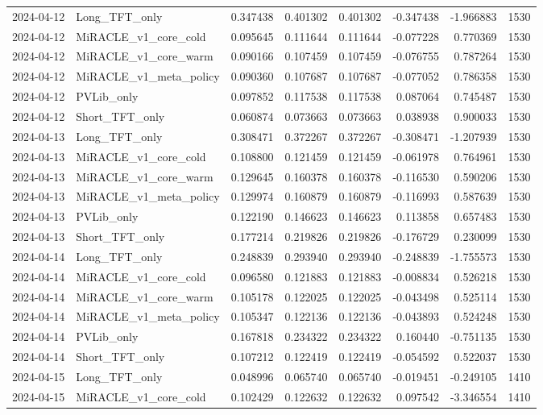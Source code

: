 \begin{tabular}{llrrrrrr}
2024-04-12 & Long_TFT_only & 0.347438 & 0.401302 & 0.401302 & -0.347438 & -1.966883 & 1530 \\
2024-04-12 & MiRACLE_v1_core_cold & 0.095645 & 0.111644 & 0.111644 & -0.077228 & 0.770369 & 1530 \\
2024-04-12 & MiRACLE_v1_core_warm & 0.090166 & 0.107459 & 0.107459 & -0.076755 & 0.787264 & 1530 \\
2024-04-12 & MiRACLE_v1_meta_policy & 0.090360 & 0.107687 & 0.107687 & -0.077052 & 0.786358 & 1530 \\
2024-04-12 & PVLib_only & 0.097852 & 0.117538 & 0.117538 & 0.087064 & 0.745487 & 1530 \\
2024-04-12 & Short_TFT_only & 0.060874 & 0.073663 & 0.073663 & 0.038938 & 0.900033 & 1530 \\
2024-04-13 & Long_TFT_only & 0.308471 & 0.372267 & 0.372267 & -0.308471 & -1.207939 & 1530 \\
2024-04-13 & MiRACLE_v1_core_cold & 0.108800 & 0.121459 & 0.121459 & -0.061978 & 0.764961 & 1530 \\
2024-04-13 & MiRACLE_v1_core_warm & 0.129645 & 0.160378 & 0.160378 & -0.116530 & 0.590206 & 1530 \\
2024-04-13 & MiRACLE_v1_meta_policy & 0.129974 & 0.160879 & 0.160879 & -0.116993 & 0.587639 & 1530 \\
2024-04-13 & PVLib_only & 0.122190 & 0.146623 & 0.146623 & 0.113858 & 0.657483 & 1530 \\
2024-04-13 & Short_TFT_only & 0.177214 & 0.219826 & 0.219826 & -0.176729 & 0.230099 & 1530 \\
2024-04-14 & Long_TFT_only & 0.248839 & 0.293940 & 0.293940 & -0.248839 & -1.755573 & 1530 \\
2024-04-14 & MiRACLE_v1_core_cold & 0.096580 & 0.121883 & 0.121883 & -0.008834 & 0.526218 & 1530 \\
2024-04-14 & MiRACLE_v1_core_warm & 0.105178 & 0.122025 & 0.122025 & -0.043498 & 0.525114 & 1530 \\
2024-04-14 & MiRACLE_v1_meta_policy & 0.105347 & 0.122136 & 0.122136 & -0.043893 & 0.524248 & 1530 \\
2024-04-14 & PVLib_only & 0.167818 & 0.234322 & 0.234322 & 0.160440 & -0.751135 & 1530 \\
2024-04-14 & Short_TFT_only & 0.107212 & 0.122419 & 0.122419 & -0.054592 & 0.522037 & 1530 \\
2024-04-15 & Long_TFT_only & 0.048996 & 0.065740 & 0.065740 & -0.019451 & -0.249105 & 1410 \\
2024-04-15 & MiRACLE_v1_core_cold & 0.102429 & 0.122632 & 0.122632 & 0.097542 & -3.346554 & 1410 \\

\end{tabular}

